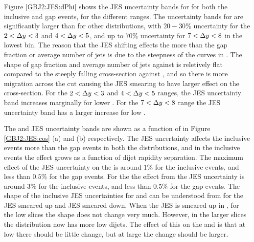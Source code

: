 Figure \ref{GBJ2:JES:dPhi} shows the JES uncertainty bands for \dphiDist{} for both the inclusive and gap events, for the different \dy{} ranges.
The uncertainty bands for \dphiDist{} are significantly larger than for other distributions, with $20-30\%$ uncertainty for the $2<\mbox{$\Delta y$}{}<3$ and $4<\mbox{$\Delta y$}{}<5$, and up to $70\%$ uncertainty for $7<\mbox{$\Delta y$}{}<8$ in the lowest \dphi{} bin.
The reason that the JES shifting effects the \dphiDist{} more than the gap fraction or average number of jets is due to the steepness of the curves in \ptb{}.
The shape of gap fraction and average number of jets against \ptb{} is reletively flat compared to the steeply falling cross-section against \ptb{}, and so there is more migration across the \pt{} cut causing the JES smearing to have larger effect on the cross-section. 
For the $2<\mbox{$\Delta y$}{}<3$ and $4<\mbox{$\Delta y$}{}<5$ ranges, the JES uncertainty band increases marginally for lower \dphi{}.
For the $7<\mbox{$\Delta y$}{}<8$ range the JES uncertainty band has a larger increase for low \dphi{}.

The \mean{\cosdphi{}} and \mean{\costwodphi{}} JES uncertainty bands are shown as a function of \dy{} in Figure \ref{GBJ2:JES:cos} (a) and (b) respectively. 
The JES uncertainty affects the inclusive events more than the gap events in both the distributions, and in the inclusive events the effect grows as a function of dijet rapidity separation.
The maximum effect of the JES uncertainty on the \mean{\cosdphi{}} is around $1\%$ for the inclusive events, and less than $0.5\%$ for the gap events.
For the \mean{\costwodphi{}} the effect from the JES uncertainty is around $3\%$ for the inclusive events, and less than $0.5\%$ for the gap events. 
The shape of the inclusive JES uncertainties for \mean{\cosdphi{}} and \mean{\costwodphi{}} can be understood from \dphiDist{} for the JES smeared up and JES smeared down. 
When the JES is smeared up in \dphiDist{}, for the low \dy{} slices the shape does not change very much.
However, in the larger \dy{} slices the distribution now has more low \dphi{} dijets.
The effect of this on the \mean{\cosdphi{}} and \mean{\costwodphi{}} is that at low \dy{} there should be little change, but at large \dy{} the change should be larger.


